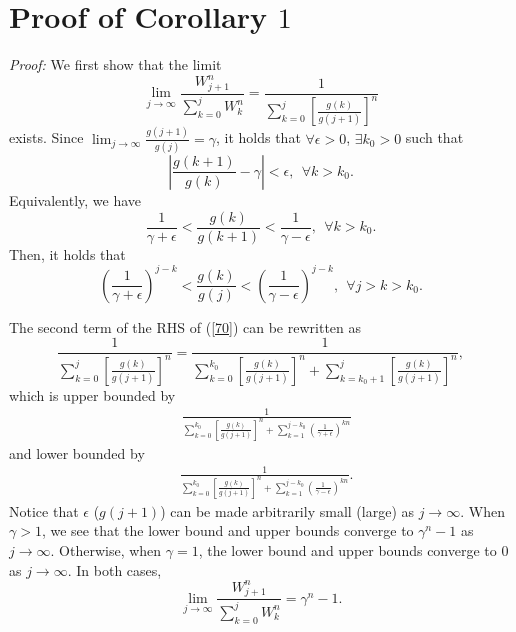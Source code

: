 \documentclass[journal]{IEEEtran}
\begin{document}
\appendices
\section{Proof of Corollary $1$}
\emph{Proof:} We first show that the limit
\begin{equation}
\label{70}
\lim_{j \rightarrow \infty}\frac{W_{j+1}^{n}}{\sum_{k=0}^{j}W_k^n} = \frac{1}{\sum_{k=0}^{j}\left[\frac{g(k)}{g(j+1)}\right]^n}
\end{equation}
exists. Since $\lim_{j\rightarrow \infty} \frac{g(j+1)}{g(j)} = \gamma$, it holds that $\forall \epsilon>0$, $\exists k_0>0$ such that
\begin{equation}
\left|\frac{g(k+1)}{g(k)}-\gamma\right|< \epsilon,\ \ \forall k>k_0.
\end{equation}
Equivalently, we have
\begin{equation}
\frac{1}{\gamma + \epsilon}<\frac{g(k)}{g(k+1)}<\frac{1}{\gamma-\epsilon},\ \ \forall k>k_0.
\end{equation}
Then, it holds that
\begin{equation}
\left(\frac{1}{\gamma+\epsilon}\right)^{j-k}<\frac{g(k)}{g(j)}<\left(\frac{1}{\gamma-\epsilon}\right)^{j-k},\ \ \forall j>k>k_0.
\end{equation}

The second term of the RHS of (\ref{70}) can be rewritten as
\begin{equation}
\label{71}
\frac{1}{\sum_{k=0}^{j}\left[\frac{g(k)}{g(j+1)}\right]^n} = \frac{1}{\sum_{k=0}^{k_0}\left[\frac{g(k)}{g(j+1)}\right]^n + \sum_{k=k_0+1}^{j}\left[\frac{g(k)}{g(j+1)}\right]^n},
\end{equation}
which is upper bounded by
\begin{equation}
\begin{aligned}
&\frac{1}{\sum_{k=0}^{k_0}\left[\frac{g(k)}{g(j+1)}\right]^n + \sum_{k=1}^{j-k_0}\left(\frac{1}{\gamma+\epsilon}\right)^{kn}}
\end{aligned}
\end{equation}
and lower bounded by
\begin{equation}
\label{76}
\begin{aligned}
&\frac{1}{\sum_{k=0}^{k_0}\left[\frac{g(k)}{g(j+1)}\right]^n + \sum_{k=1}^{j-k_0}\left(\frac{1}{\gamma-\epsilon}\right)^{kn}}.
\end{aligned}
\end{equation}
Notice that $\epsilon$ ($g(j+1)$) can be made arbitrarily small (large) as $j\rightarrow \infty$. When $\gamma>1$, we see that the lower bound and upper bounds converge to $\gamma^n-1$ as $j\rightarrow \infty$. Otherwise, when $\gamma=1$, the lower bound and upper bounds converge to $0$ as $j\rightarrow \infty$. In both cases,
\begin{equation}
\label{63}
\lim_{j\rightarrow\infty}\frac{W_{j+1}^{n}}{\sum_{k=0}^{j}W_k^n} = \gamma^n-1.
\end{equation}
\end{document}
